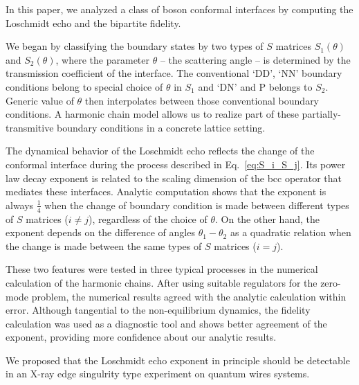 
In this paper, we analyzed a class of boson conformal interfaces by computing the Loschmidt echo and the bipartite fidelity. 

We began by classifying the boundary states by two types of $S$ matrices $S_1(\theta)$ and $S_2(\theta)$, where the parameter $\theta$ -- the scattering angle -- is determined by the transmission coefficient of the interface. The conventional `DD', `NN' boundary conditions belong to special choice of $\theta$ in $S_1$ and  `DN' and P belongs to $S_2$. Generic value of $\theta$ then interpolates between those conventional boundary conditions. A harmonic chain model allows us to realize part of these partially-transmitive boundary conditions in a concrete lattice setting. 

The dynamical behavior of the Loschmidt echo reflects the change of the conformal interface during the process described in {\color{red}Eq.~\eqref{eq:S_i_S_j}}.
Its power law decay exponent is related to the scaling dimension of the bcc operator that mediates these interfaces. Analytic computation shows that the exponent is always $\frac{1}{4}$ when the change of boundary condition is made between different types of $S$ matrices ($i \ne j$), regardless of the choice of $\theta$. On the other hand, the exponent depends on the difference of angles $\theta_1 - \theta_2$ as a quadratic relation when the change is made between the same types of $S$ matrices ($i = j$).

These two features were tested in three typical processes in the numerical calculation of the harmonic chains. After using suitable regulators for the zero-mode problem, the numerical results agreed with the analytic calculation within error. Although tangential to the non-equilibrium dynamics, the fidelity calculation was used as a diagnostic tool and shows better agreement of the exponent, providing more confidence about our analytic results. 

We proposed that the Loschmidt echo exponent in principle should be detectable in an X-ray edge singulrity type experiment on quantum wires systems. 

